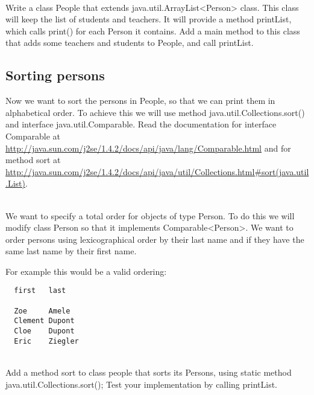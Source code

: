 \documentclass{exercices}
\begin{document}
\begin{exercice}\\
Write a class People that extends java.util.ArrayList<Person> class.
This class will keep the list of students and teachers.
It will provide a method printList, which calls print() for each Person it contains.
Add a main method to this class that adds some teachers and students to People, and call printList.
\end{exercice}

\subsection{Sorting persons}
Now we want to sort the persons in People, so that we can print them in alphabetical order.
To achieve this we will use method java.util.Collections.sort() and interface java.util.Comparable.
Read the documentation for interface Comparable at
\url{http://java.sun.com/j2se/1.4.2/docs/api/java/lang/Comparable.html}
and for method sort at
\url{http://java.sun.com/j2se/1.4.2/docs/api/java/util/Collections.html#sort(java.util.List)}.

\begin{exercice}\\
We want to specify a total order for objects of type Person. 
To do this we will modify class Person so that it implements Comparable<Person>.
We want to order persons using lexicographical order by their last name and if they have 
the same last name by their first name.

For example this would be a valid ordering:
\begin{verbatim}
  first   last

  Zoe     Amele
  Clement Dupont
  Cloe    Dupont
  Eric    Ziegler
\end{verbatim}
\end{exercice}
\begin{exercice}\\
Add a method sort to class people that sorts its Persons, using static method java.util.Collections.sort();
Test your implementation by calling printList.
\end{exercice}
\end{document}
